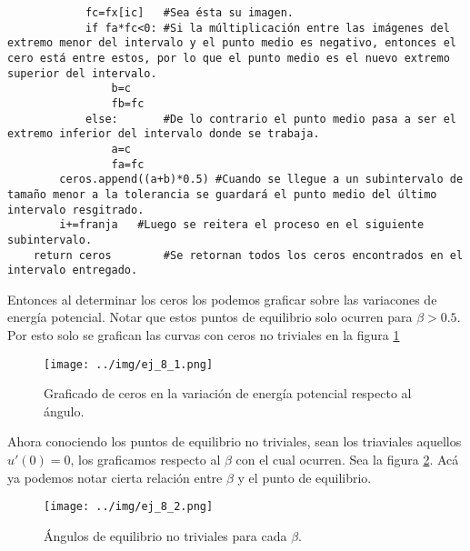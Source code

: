 \documentclass[../portafolio.tex]{subfiles}
\begin{document}
\begin{verbatim}
            fc=fx[ic]	#Sea ésta su imagen.
            if fa*fc<0:	#Si la múltiplicación entre las imágenes del extremo menor del intervalo y el punto medio es negativo, entonces el cero está entre estos, por lo que el punto medio es el nuevo extremo superior del intervalo.
                b=c
                fb=fc
            else:		#De lo contrario el punto medio pasa a ser el extremo inferior del intervalo donde se trabaja.
                a=c
                fa=fc
        ceros.append((a+b)*0.5)	#Cuando se llegue a un subintervalo de tamaño menor a la tolerancia se guardará el punto medio del último intervalo resgitrado.
        i+=franja	#Luego se reitera el proceso en el siguiente subintervalo.
    return ceros		#Se retornan todos los ceros encontrados en el intervalo entregado.
\end{verbatim}
Entonces al determinar los ceros los podemos graficar sobre las variacones de energía potencial. Notar que estos puntos de equilibrio solo ocurren para $\beta>0.5$. Por esto solo se grafican las curvas con ceros no triviales en la figura \ref{g5_ej8_graf1}

\begin{figure}
\centering
\texttt{[image: ../img/ej\_8\_1.png]}
\caption{Graficado de ceros en la variación de energía potencial respecto al ángulo.} \label{g5_ej8_graf1}
\end{figure}

Ahora conociendo los puntos de equilibrio no triviales, sean los triaviales aquellos $u'(0)=0$, los graficamos respecto al $\beta$ con el cual ocurren. Sea la figura \ref{g5_ej8_graf2}. Acá ya podemos notar cierta relación entre $\beta$ y el punto de equilibrio.

\begin{figure}
\centering
\texttt{[image: ../img/ej\_8\_2.png]}
\caption{Ángulos de equilibrio no triviales para cada $\beta$.} \label{g5_ej8_graf2}
\end{figure}
\end{document}
